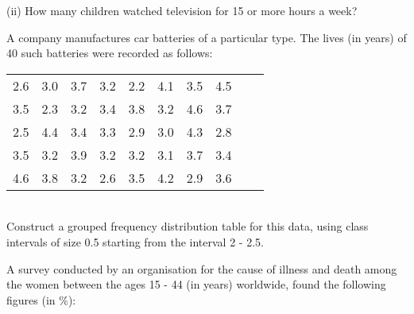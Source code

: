 (ii)  How many children watched television for 15 or more hours a week?\\
\item A company manufactures car batteries of a particular type. The lives (in years) of 40 such batteries were recorded as follows:\\
\begin{tabular}{ cccccccccc } 
 2.6 &3.0 &3.7 &3.2 &2.2 &4.1 &3.5 &4.5 \\ 
 3.5 &2.3 &3.2 &3.4 &3.8 &3.2 &4.6 &3.7\\ 
 2.5 &4.4 &3.4 &3.3 &2.9 &3.0 &4.3 &2.8\\ 
 3.5 &3.2 &3.9 &3.2 &3.2 &3.1 &3.7 &3.4\\ 
 4.6 &3.8 &3.2 &2.6 &3.5 &4.2 &2.9 &3.6\\ 
\end{tabular}\\
Construct a grouped frequency distribution table for this data, using class intervals of size 0.5 starting from the interval 2 - 2.5.\\
\item A survey conducted by an organisation for the cause of illness and death among the women between the ages 15 - 44 (in years) worldwide, found the following figures (in $\%$):\\

